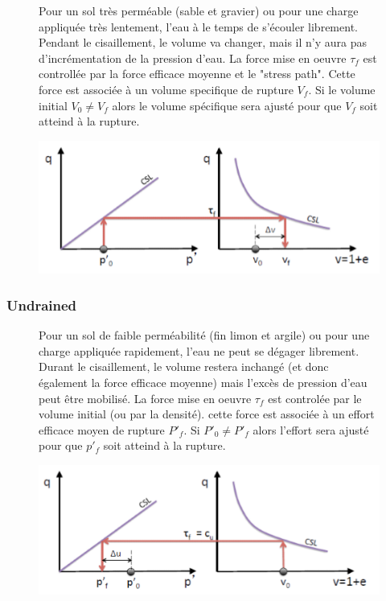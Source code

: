             \begin{figure}[h!]
            Pour un sol très perméable (sable et gravier) ou pour une charge appliquée très lentement, l'eau à le temps de s'écouler librement. Pendant le cisaillement, le volume va changer, mais il n'y aura pas d'incrémentation de la pression d'eau. La force mise en oeuvre $\tau_f$ est controllée par la force efficace moyenne et le "stress path". Cette force est associée à un volume specifique de rupture $V_f$. Si le volume initial $V_0 \ne V_f$ alors le volume spécifique sera ajusté pour que $V_f$ soit atteind à la rupture. 
            
                \center
                \includegraphics[scale=1]{Verastegui/images/V11.PNG}
            \end{figure}
            
        \subsubsection{Undrained}
        
            \begin{figure}[h!]
            Pour un sol de faible perméabilité (fin limon et argile) ou pour une charge appliquée rapidement, l'eau ne peut se dégager librement. Durant le cisaillement, le volume restera inchangé (et donc également la force efficace moyenne) mais l'excès de pression d'eau peut être mobilisé. La force mise en oeuvre $\tau_f$ est controlée par le volume initial (ou par la densité). cette force est associée à un effort efficace moyen de rupture $P'_f$. Si $P'_0 \ne P'_f$ alors l'effort sera ajusté pour que $p'_f$ soit atteind à la rupture.
    
                \center
                \includegraphics[scale=1]{Verastegui/images/V12.PNG}
            \end{figure}        

